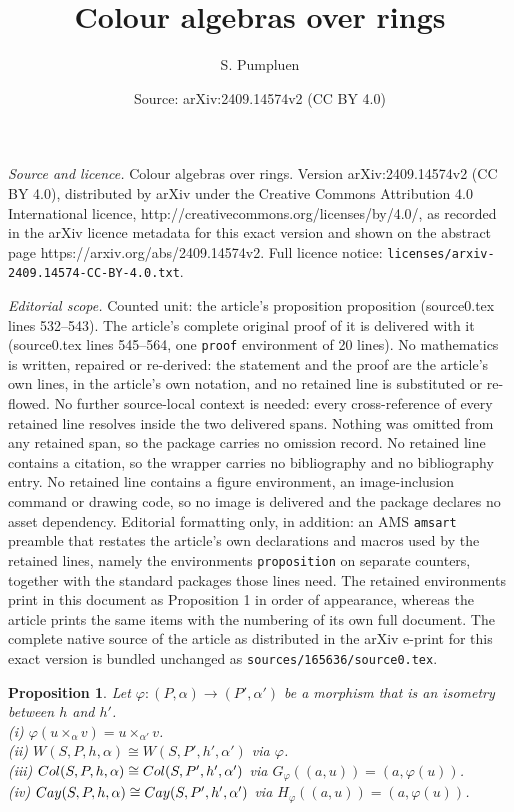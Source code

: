 \documentclass[10pt,a4paper]{amsart}
\title{Colour algebras over rings}
\author{S. Pumpluen}
\date{Source: arXiv:2409.14574v2 (CC BY 4.0)}
\newtheorem{proposition}{Proposition}
\begin{document}
\maketitle

\noindent\emph{Source and licence.} Colour algebras over rings. Version arXiv:2409.14574v2 (CC BY 4.0), distributed by arXiv under the Creative Commons Attribution 4.0 International licence, http://creativecommons.org/licenses/by/4.0/, as recorded in the arXiv licence metadata for this exact version and shown on the abstract page https://arxiv.org/abs/2409.14574v2. Full licence notice: \texttt{licenses/arxiv-2409.14574-CC-BY-4.0.txt}.\par\smallskip

\noindent\textit{Editorial scope.} Counted unit: the article's proposition proposition (source0.tex lines 532--543). The article's complete original proof of it is delivered with it (source0.tex lines 545--564, one \texttt{proof} environment of 20 lines). No mathematics is written, repaired or re-derived: the statement and the proof are the article's own lines, in the article's own notation, and no retained line is substituted or re-flowed.  No further source-local context is needed: every cross-reference of every retained line resolves inside the two delivered spans.  Nothing was omitted from any retained span, so the package carries no omission record.  No retained line contains a citation, so the wrapper carries no bibliography and no bibliography entry.  No retained line contains a figure environment, an image-inclusion command or drawing code, so no image is delivered and the package declares no asset dependency.  Editorial formatting only, in addition: an AMS \texttt{amsart} preamble that restates the article's own declarations and macros used by the retained lines, namely the environments \texttt{proposition} on separate counters, together with the standard packages those lines need.  The retained environments print in this document as Proposition 1 in order of appearance, whereas the article prints the same items with the numbering of its own full document.  The complete native source of the article as distributed in the arXiv e-print for this exact version is bundled unchanged as \texttt{sources/165636/source0.tex}.
 \begin{proposition}
 Let $ \varphi:(P,\alpha)\rightarrow (P',\alpha') $
 be a morphism that is an isometry between $h$ and $h'$.
\\ (i)  $\varphi(u\times_{\alpha}v)=u\times_{\alpha'}v$.
 \\ (ii)  $W(S,P,h,\alpha)\cong W(S, P',h',\alpha')$
 via $\varphi$.
\\ (iii)  ${\rm Col}(S, P,h,\alpha)\cong {\rm Col}(S, P',h',\alpha')$
 via $G_\varphi((a,u))=(a,\varphi(u))$.
 \\ (iv)
 ${\rm Cay}(S,P,h,\alpha)\cong {\rm Cay}(S, P',h',\alpha')$
 via $H_\varphi((a,u))=(a,\varphi(u))$.
\end{proposition}
\end{document}
